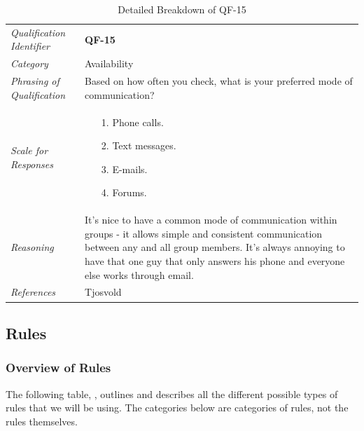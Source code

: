 \documentclass[12pt,letterpaper]{article}
\begin{document}
\begin{table}[H]
	\caption{Detailed Breakdown of QF-15}
	\begin{tabu} to 
		\toprule
		Qualification Identifier & {\bf QF-15}\\
		Category & Availability \\
		Phrasing of Qualification & Based on how often you check, what is your preferred mode of communication? \\
		Scale for Responses &
		\begin{minipage}[t]{\linewidth}
			\begin{enumerate}
				\item[1.] Phone calls.
				\item[2.] Text messages.
				\item[3.] E-mails.
				\item[4.] Forums.
			\end{enumerate}
		\end{minipage}\\
		Reasoning & It's nice to have a common mode of communication within groups - it allows simple and consistent communication between any and all group members. It's always annoying to have that one guy that only answers his phone and everyone else works through email.\\
		References & Tjosvold\cite{tjosvold}\\
		\toprule
	\end{tabu}
\end{table}

\subsection{Rules}
\subsubsection{Overview of Rules}

The following table, , outlines and describes all the different possible types of rules that we will be using. The categories below are categories of rules, not the rules themselves.
\end{document}
